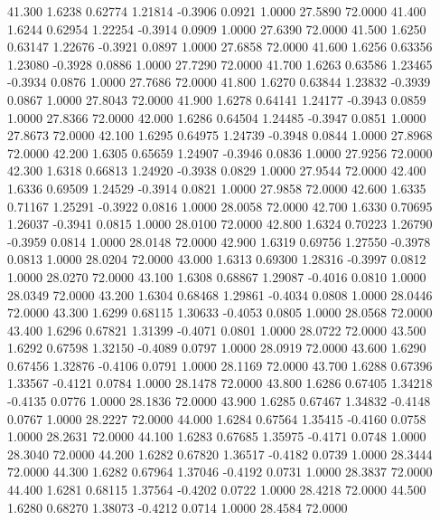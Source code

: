   41.300   1.6238   0.62774   1.21814  -0.3906   0.0921   1.0000  27.5890  72.0000
  41.400   1.6244   0.62954   1.22254  -0.3914   0.0909   1.0000  27.6390  72.0000
  41.500   1.6250   0.63147   1.22676  -0.3921   0.0897   1.0000  27.6858  72.0000
  41.600   1.6256   0.63356   1.23080  -0.3928   0.0886   1.0000  27.7290  72.0000
  41.700   1.6263   0.63586   1.23465  -0.3934   0.0876   1.0000  27.7686  72.0000
  41.800   1.6270   0.63844   1.23832  -0.3939   0.0867   1.0000  27.8043  72.0000
  41.900   1.6278   0.64141   1.24177  -0.3943   0.0859   1.0000  27.8366  72.0000
  42.000   1.6286   0.64504   1.24485  -0.3947   0.0851   1.0000  27.8673  72.0000
  42.100   1.6295   0.64975   1.24739  -0.3948   0.0844   1.0000  27.8968  72.0000
  42.200   1.6305   0.65659   1.24907  -0.3946   0.0836   1.0000  27.9256  72.0000
  42.300   1.6318   0.66813   1.24920  -0.3938   0.0829   1.0000  27.9544  72.0000
  42.400   1.6336   0.69509   1.24529  -0.3914   0.0821   1.0000  27.9858  72.0000
  42.600   1.6335   0.71167   1.25291  -0.3922   0.0816   1.0000  28.0058  72.0000
  42.700   1.6330   0.70695   1.26037  -0.3941   0.0815   1.0000  28.0100  72.0000
  42.800   1.6324   0.70223   1.26790  -0.3959   0.0814   1.0000  28.0148  72.0000
  42.900   1.6319   0.69756   1.27550  -0.3978   0.0813   1.0000  28.0204  72.0000
  43.000   1.6313   0.69300   1.28316  -0.3997   0.0812   1.0000  28.0270  72.0000
  43.100   1.6308   0.68867   1.29087  -0.4016   0.0810   1.0000  28.0349  72.0000
  43.200   1.6304   0.68468   1.29861  -0.4034   0.0808   1.0000  28.0446  72.0000
  43.300   1.6299   0.68115   1.30633  -0.4053   0.0805   1.0000  28.0568  72.0000
  43.400   1.6296   0.67821   1.31399  -0.4071   0.0801   1.0000  28.0722  72.0000
  43.500   1.6292   0.67598   1.32150  -0.4089   0.0797   1.0000  28.0919  72.0000
  43.600   1.6290   0.67456   1.32876  -0.4106   0.0791   1.0000  28.1169  72.0000
  43.700   1.6288   0.67396   1.33567  -0.4121   0.0784   1.0000  28.1478  72.0000
  43.800   1.6286   0.67405   1.34218  -0.4135   0.0776   1.0000  28.1836  72.0000
  43.900   1.6285   0.67467   1.34832  -0.4148   0.0767   1.0000  28.2227  72.0000
  44.000   1.6284   0.67564   1.35415  -0.4160   0.0758   1.0000  28.2631  72.0000
  44.100   1.6283   0.67685   1.35975  -0.4171   0.0748   1.0000  28.3040  72.0000
  44.200   1.6282   0.67820   1.36517  -0.4182   0.0739   1.0000  28.3444  72.0000
  44.300   1.6282   0.67964   1.37046  -0.4192   0.0731   1.0000  28.3837  72.0000
  44.400   1.6281   0.68115   1.37564  -0.4202   0.0722   1.0000  28.4218  72.0000
  44.500   1.6280   0.68270   1.38073  -0.4212   0.0714   1.0000  28.4584  72.0000
